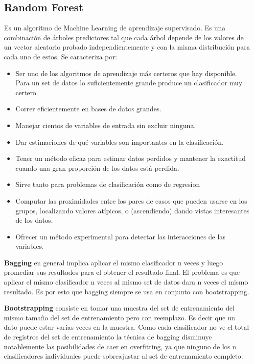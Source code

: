 \documentclass[a4paper,10pt]{article}
\begin{document}
\subsection{Random Forest}
Es un algoritmo de Machine Learning de aprendizaje supervisado. Es una combinación de árboles predictores tal que cada árbol depende de los valores de un vector aleatorio probado independientemente y con la misma distribución para cada uno de estos. Se caracteriza por:
\begin{itemize}
\item Ser uno de los algoritmos de aprendizaje más certeros que hay disponible. Para un set de datos lo suficientemente grande produce un clasificador muy certero. 
\item Correr eficientemente en bases de datos grandes.
\item Manejar cientos de variables de entrada sin excluir ninguna.
\item Dar estimaciones de qué variables son importantes en la clasificación.
\item Tener un método eficaz para estimar datos perdidos y mantener la exactitud cuando una gran proporción de los datos está perdida.
\item Sirve tanto para problemas de clasificación como de regresion
\item Computar las proximidades entre los pares de casos que pueden usarse en los grupos, localizando valores atípicos, o (ascendiendo) dando vistas interesantes de los datos.
\item Ofrecer un método experimental para detectar las interacciones de las variables.
\end{itemize}


\textbf{Bagging} en general implica aplicar el mismo clasificador n veces y luego promediar sus resultados para el obtener el resultado final. El problema es que aplicar el mismo clasificador n veces al mismo set de datos dara n veces el mismo resultado. Es por esto que bagging siempre se usa en conjunto con bootstrapping. 

\textbf{Bootstrapping} consiste en tomar una muestra del set de entrenamiento del mismo tamaño del set de entrenamiento pero con reemplazo. Es decir que un dato puede estar varias veces en la muestra. Como cada clasificador no ve el total de registros del set de entrenamiento la técnica de bagging disminuye notablemente las posibilidades de caer en overfitting, ya que ninguno de los n clasificadores individuales puede sobreajustar al set de entrenamiento completo.
\end{document}
